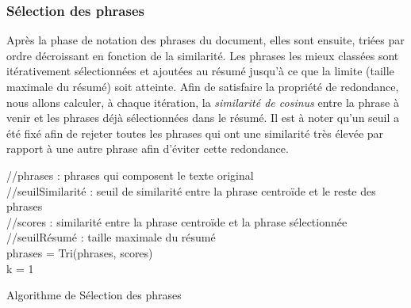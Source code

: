         \subsubsection{Sélection des phrases}
       Après la phase de notation des phrases du document, elles sont ensuite, triées par ordre décroissant en fonction de la similarité. Les phrases les mieux classées sont itérativement sélectionnées et ajoutées au résumé jusqu'à ce que la limite (taille maximale du résumé) soit atteinte. Afin de satisfaire la propriété de redondance, nous allons calculer, à chaque itération, la \emph{similarité de cosinus} entre la phrase à venir et les phrases déjà sélectionnées dans le résumé. Il est à noter qu'un seuil a été fixé afin de rejeter toutes les phrases qui ont une similarité très élevée par rapport à une autre phrase afin d'éviter cette redondance.\\
        \begin{algorithm2e}[H]
            \SetAlgoLined
            //phrases : phrases qui composent le texte original\\
            //seuilSimilarité : seuil de similarité entre la phrase centroïde et le reste des phrases\\
            //scores : similarité entre la phrase centroïde et la phrase sélectionnée\\
            //seuilRésumé : taille maximale du résumé\\
            phrases = Tri(phrases, scores)\\
            k = 1\\
            \caption{Algorithme de Sélection des phrases}
        \end{algorithm2e}

